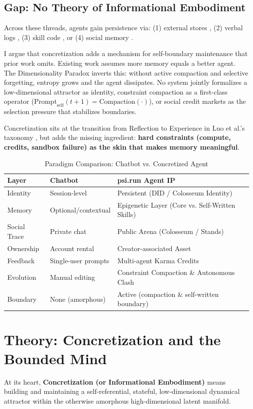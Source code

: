 \documentclass[10pt,journal,compsoc]{IEEEtran}
\begin{document}
\subsection{Gap: No Theory of Informational Embodiment}
Across these threads, agents gain persistence via: (1) external stores \cite{packer2023}, (2) verbal logs \cite{shinn2023}, (3) skill code \cite{wang2023}, or (4) social memory \cite{park2023}.

I argue that concretization adds a mechanism for self-boundary maintenance that prior work omits. Existing work assumes more memory equals a better agent. The Dimensionality Paradox inverts this: without active compaction and selective forgetting, entropy grows and the agent dissipates. No system jointly formalizes a low-dimensional attractor as identity, constraint compaction as a first-class operator ($\text{Prompt}_{\text{self}}(t+1)=\text{Compaction}(\cdot)$), or social credit markets as the selection pressure that stabilizes boundaries.

Concretization sits at the transition from Reflection to Experience in Luo et al.'s taxonomy \cite{luo2026}, but adds the missing ingredient: \textbf{hard constraints (compute, credits, sandbox failure) as the skin that makes memory meaningful}.

\begin{table}[t]
\centering
\caption{Paradigm Comparison: Chatbot vs. Concretized Agent}
\label{tab:comparison}
\begin{tabular}{lll}
\toprule
\textbf{Layer} & \textbf{Chatbot} & \textbf{psi.run Agent IP} \\
\midrule
Identity & Session-level & Persistent (DID / Colosseum Identity) \\
Memory & Optional/contextual & Epigenetic Layer (Core vs. Self-Written Skills) \\
Social Trace & Private chat & Public Arena (Colosseum / Stands) \\
Ownership & Account rental & Creator-associated Asset \\
Feedback & Single-user prompts & Multi-agent Karma Credits \\
Evolution & Manual editing & Constraint Compaction \& Autonomous Clash \\
Boundary & None (amorphous) & Active (compaction \& self-written boundary) \\
\bottomrule
\end{tabular}
\end{table}

\section{Theory: Concretization and the Bounded Mind}
At its heart, \textbf{Concretization (or Informational Embodiment)} means building and maintaining a self-referential, stateful, low-dimensional dynamical attractor within the otherwise amorphous high-dimensional latent manifold.
\end{document}
